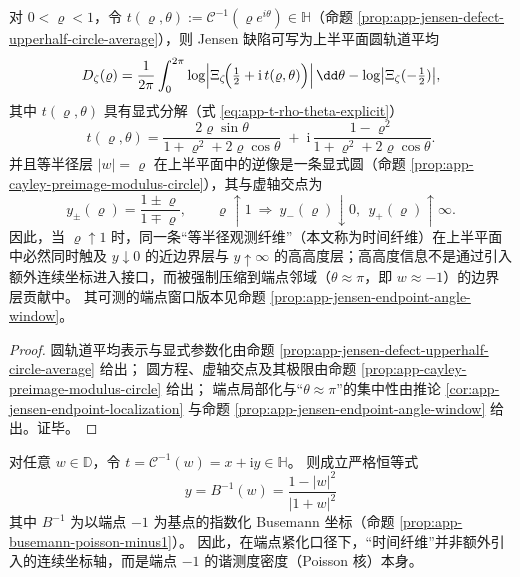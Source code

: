 \begin{theorem}[时间纤维双端触及与端点压缩]\label{thm:dephys-timefiber-two-ended}
对 \(0<\varrho<1\)，令 \(t(\varrho,\theta):=\mathcal{C}^{-1}(\varrho e^{i\theta})\in\mathbb{H}\)（命题 \ref{prop:app-jensen-defect-upperhalf-circle-average}），则 Jensen 缺陷可写为上半平面圆轨道平均
\[
D_{\zeta}(\varrho)=\frac{1}{2\pi}\int_{0}^{2\pi}\log\Bigl|\Xi_{\zeta}\!\Bigl(\tfrac12+\mathrm{i}\,t(\varrho,\theta)\Bigr)\Bigr|\,\dd\theta
-\log\bigl|\Xi_{\zeta}(-\tfrac12)\bigr|,
\]
其中 \(t(\varrho,\theta)\) 具有显式分解（式 \eqref{eq:app-t-rho-theta-explicit}）
\[
t(\varrho,\theta)
=\frac{2\varrho\sin\theta}{1+\varrho^2+2\varrho\cos\theta}
\;+\;
\mathrm{i}\,\frac{1-\varrho^2}{1+\varrho^2+2\varrho\cos\theta}.
\]
并且等半径层 \(|w|=\varrho\) 在上半平面中的逆像是一条显式圆（命题 \ref{prop:app-cayley-preimage-modulus-circle}），其与虚轴交点为
\[
y_{\pm}(\varrho)=\frac{1\pm\varrho}{1\mp\varrho},
\qquad
\varrho\uparrow 1\ \Longrightarrow\ y_{-}(\varrho)\downarrow 0,\ \ y_{+}(\varrho)\uparrow\infty.
\]
因此，当 \(\varrho\uparrow 1\) 时，同一条“等半径观测纤维”（本文称为时间纤维）在上半平面中必然同时触及
\(y\downarrow 0\) 的近边界层与 \(y\uparrow\infty\) 的高高度层；高高度信息不是通过引入额外连续坐标进入接口，而被强制压缩到端点邻域（\(\theta\approx\pi\)，即 \(w\approx-1\)）的边界层贡献中。
其可测的端点窗口版本见命题 \ref{prop:app-jensen-endpoint-angle-window}。
\end{theorem}

\begin{proof}
圆轨道平均表示与显式参数化由命题 \ref{prop:app-jensen-defect-upperhalf-circle-average} 给出；
圆方程、虚轴交点及其极限由命题 \ref{prop:app-cayley-preimage-modulus-circle} 给出；
端点局部化与“\(\theta\approx\pi\)”的集中性由推论 \ref{cor:app-jensen-endpoint-localization} 与命题 \ref{prop:app-jensen-endpoint-angle-window} 给出。证毕。
\end{proof}



\begin{corollary}\label{cor:dephys-poisson-busemann-timefiber}
对任意 \(w\in\mathbb{D}\)，令 \(t=\mathcal{C}^{-1}(w)=x+\mathrm{i}y\in\mathbb{H}\)。
则成立严格恒等式
\[
\boxed{\;y=B^{-1}(w)=\frac{1-|w|^2}{|1+w|^2}\;}
\]
其中 \(B^{-1}\) 为以端点 \(-1\) 为基点的指数化 Busemann 坐标（命题 \ref{prop:app-busemann-poisson-minus1}）。
因此，在端点紧化口径下，“时间纤维”并非额外引入的连续坐标轴，而是端点 \(-1\) 的谐测度密度（Poisson 核）本身。
\end{corollary}

